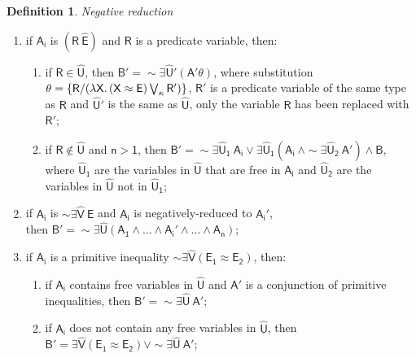 \documentclass[inscr,ack,preface]{dithesis}
\theoremstyle{definition}
\newtheorem{definition}{Definition}[]
\newcommand{\msf}[1]{$\mathsf{#1}$}
\begin{document}
\begin{definition}{\emph{Negative reduction}}
\begin{enumerate}
\begin{enumerate}
                then \msf{B' = \sim \exists \widehat{U}_1 ~ A_i \lor \exists \widehat{U}_1 \left( A_i ~\land \sim \exists \widehat{U}_2 ~ A' \right)}, where \msf{\widehat{U}_1} are the variables in \msf{\widehat{U}} that are free in \msf{A_i} and \msf{\widehat{U}_2} are the variables in \msf{\widehat{U}} not in \msf{\widehat{U}_1};
        \end{enumerate}
  \item if \msf{A_i} is \msf{\left( R ~ \widehat{E} \right)} and \msf{R} is a predicate variable, then:
        \begin{enumerate}
          \item if \msf{R \in \widehat{U}},
                then \msf{B' = \sim \exists \widehat{U}' \left( A' \theta \right)},
                where substitution \msf{\theta = \left\{ R \middle/ \left( \lambda X . \left( X \approx E \right) \bigvee_{\kappa} R' \right) \right\}}, \msf{R'} is a predicate variable of the same type as \msf{R} and \msf{\widehat{U}'} is the same as \msf{\widehat{U}}, only the variable \msf{R} has been replaced with \msf{R'};
          \item if \msf{R \not \in \widehat{U}} and \msf{n > 1},
                then \msf{B' = \sim \exists \widehat{U}_1 ~ A_i \lor \exists \widehat{U}_1 \left( A_i ~\land \sim \exists \widehat{U}_2 ~ A' \right) \land B},
                where \msf{\widehat{U}_1} are the variables in \msf{\widehat{U}} that are free in \msf{A_i} and \msf{\widehat{U}_2} are the variables in \msf{\widehat{U}} not in \msf{\widehat{U}_1};
        \end{enumerate}
  \item if \msf{A_i} is \msf{\sim \exists \widehat{V} ~ E} and \msf{A_i} is negatively-reduced to \msf{A_i'}, \\
        then \msf{B' = \sim \exists \widehat{U} \left( A_1 \land \dots \land A_i' \land \dots \land A_n \right)};
  \item if \msf{A_i} is a primitive inequality \msf{\sim \exists \widehat{V} \left( E_1 \approx E_2 \right)}, then:
        \begin{enumerate}
          \item if \msf{A_i} contains free variables in \msf{\widehat{U}} and \msf{A'} is a conjunction of primitive inequalities, then \msf{B' = \sim \exists \widehat{U} ~ A'};
          \item if \msf{A_i} does not contain any free variables in \msf{\widehat{U}}, then \msf{B' = \exists \widehat{V} \left( E_1 \approx E_2 \right) \lor \sim \exists \widehat{U} ~ A'};

\end{enumerate}
\end{enumerate}
\end{definition}
\end{document}
